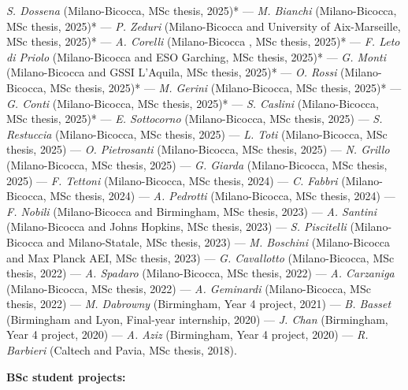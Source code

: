 \textit{S. Dossena} (Milano-Bicocca, MSc thesis, 2025)* --- 
\textit{M. Bianchi} (Milano-Bicocca, MSc thesis, 2025)* --- 
\textit{P. Zeduri} (Milano-Bicocca and University of Aix-Marseille, MSc thesis, 2025)* --- 
\textit{A. Corelli} (Milano-Bicocca , MSc thesis, 2025)* --- 
\textit{F. Leto di Priolo} (Milano-Bicocca and ESO Garching, MSc thesis, 2025)* --- 
\textit{G. Monti} (Milano-Bicocca and GSSI L'Aquila, MSc thesis, 2025)* --- 
\textit{O. Rossi} (Milano-Bicocca, MSc thesis, 2025)* --- 
\textit{M. Gerini} (Milano-Bicocca, MSc thesis, 2025)* --- 
\textit{G. Conti} (Milano-Bicocca, MSc thesis, 2025)* --- 
\textit{S. Caslini} (Milano-Bicocca, MSc thesis, 2025)* --- 
\textit{E. Sottocorno} (Milano-Bicocca, MSc thesis, 2025) --- 
\textit{S. Restuccia} (Milano-Bicocca, MSc thesis, 2025) --- 
\textit{L. Toti} (Milano-Bicocca, MSc thesis, 2025) --- 
\textit{O. Pietrosanti} (Milano-Bicocca, MSc thesis, 2025) --- 
\textit{N. Grillo} (Milano-Bicocca, MSc thesis, 2025) --- 
\textit{G. Giarda} (Milano-Bicocca, MSc thesis, 2025) --- 
\textit{F. Tettoni} (Milano-Bicocca, MSc thesis, 2024) --- 
\textit{C. Fabbri} (Milano-Bicocca, MSc thesis, 2024) --- 
\textit{A. Pedrotti} (Milano-Bicocca, MSc thesis, 2024) --- 
\textit{F. Nobili} (Milano-Bicocca and Birmingham, MSc thesis, 2023) --- 
\textit{A. Santini} (Milano-Bicocca and Johns Hopkins, MSc thesis, 2023) --- 
\textit{S. Piscitelli} (Milano-Bicocca and Milano-Statale, MSc thesis, 2023) --- 
\textit{M. Boschini} (Milano-Bicocca and Max Planck AEI, MSc thesis, 2023) --- 
\textit{G. Cavallotto} (Milano-Bicocca, MSc thesis, 2022) --- 
\textit{A. Spadaro} (Milano-Bicocca, MSc thesis, 2022) --- 
\textit{A. Carzaniga} (Milano-Bicocca, MSc thesis, 2022) --- 
\textit{A. Geminardi} (Milano-Bicocca, MSc thesis, 2022) --- 
\textit{M. Dabrowny} (Birmingham, Year 4 project, 2021) --- 
\textit{B. Basset} (Birmingham and Lyon, Final-year internship, 2020) --- 
\textit{J. Chan} (Birmingham, Year 4 project, 2020) --- 
\textit{A. Aziz} (Birmingham, Year 4 project, 2020) --- 
\textit{R. Barbieri} (Caltech and Pavia, MSc thesis, 2018).

\vspace{0.2cm}
\textbf{BSc student projects:}

